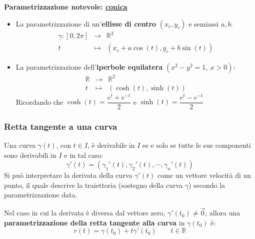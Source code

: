 \documentclass[a4paper]{article}
\newcommand{\definition}[1]{\textcolor{Red3}{\textbf{#1}}}
\begin{document}
	\begin{flushleft}
		\definition{Parametrizzazione notevole: \underline{conica}}
	\end{flushleft}
	\begin{itemize}
		\item La parametrizzazione di un'\textbf{ellisse di centro} $\left(x_{c}, y_{c}\right)$ e semiassi $a,b$:
		\begin{equation*}\label{eq: parametrizzazione ellisse di centro}
			\begin{array}{rcl}
				\gamma:\left[0,2\pi\right] &\rightarrow& \mathbb{R}^{2} \\
				t &\mapsto& \left(x_{c} + a \cos\left(t\right), y_{c} + b \sin\left(t\right)\right)
			\end{array}
		\end{equation*}

		\item La parametrizzazione dell'\textbf{iperbole equilatera} $\left(x^{2}-y^{2} = 1, \: x > 0\right)$:
		\begin{equation*}
			\begin{array}{rcl}
				\mathbb{R} &\rightarrow& \mathbb{R}^{2} \\
				t &\mapsto& \left(\cosh\left(t\right), \sinh\left(t\right)\right)
			\end{array}
		\end{equation*}
		Ricordando che $\cosh\left(t\right) = \dfrac{e^{t} + e^{-t}}{2}$ e $\sinh\left(t\right) = \dfrac{e^{t} - e^{-t}}{2}$
	\end{itemize}\newpage

	\subsubsection{Retta tangente a una curva}\label{subsubsection: retta tangente a una curva}

	Una curva $\gamma\left(t\right)$, con $t \in I$, è derivabile in $I$ se e solo se tutte le sue componenti sono derivabili in $I$ e in tal caso:
	\begin{equation*}
		\gamma'\left(t\right) = \left(\gamma_{1}'\left(t\right), \gamma_{2}'\left(t\right), \cdots, \gamma_{n}'\left(t\right)\right)
	\end{equation*}
	Si può interpretare la derivata della curva $\gamma'\left(t\right)$ come un vettore velocità di un punto, il quale descrive la traiettoria (sostegno della curva $\gamma$) secondo la parametrizzazione data.

	Nel caso in cui la derivata è diversa dal vettore zero, $\gamma'\left(t_{0}\right) \ne \overrightarrow{0}$, allora una \definition{parametrizzazione della retta tangente alla curva} in $\gamma\left(t_{0}\right)$ è:
	\begin{equation}\label{eq: parametrizzazione della retta tangente alla curva}
		r\left(t\right) = \gamma\left(t_{0}\right) + t\gamma'\left(t_{0}\right) \hspace{2em} t \in \mathbb{R}
	\end{equation}
\end{document}
